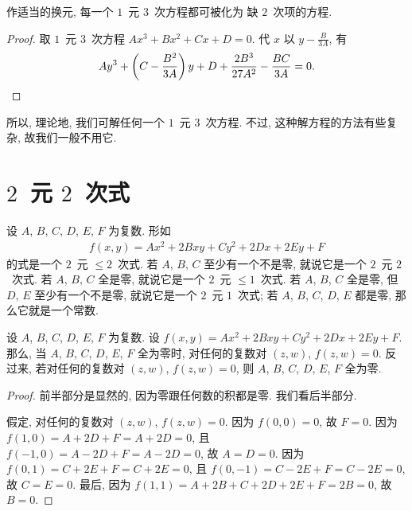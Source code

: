 \begin{theorem}
    作适当的换元,
    每一个 \(1\)~元 \(3\)~次方程都可被化为%
    缺 \(2\)~次项的方程.
\end{theorem}

\begin{proof}
    取 \(1\)~元 \(3\)~次方程 \(Ax^3 + Bx^2 + Cx + D = 0\).
    代 \(x\) 以 \(y - \frac{B}{3A}\), 有
    \begin{equation*}
        Ay^3 + \left(C - \frac{B^2}{3A} \right)y
        + D + \frac{2B^3}{27A^2} - \frac{BC}{3A} = 0.
        \qedhere
    \end{equation*}
\end{proof}

所以, 理论地, 我们可解任何一个 \(1\)~元 \(3\)~次方程.
不过, 这种解方程的方法有些复杂,
故我们一般不用它.

\section{\texorpdfstring{\(2\)~元 \(2\)~次式}{2 元 2 次式}}

设 \(A\), \(B\), \(C\), \(D\), \(E\), \(F\) 为复数.
形如
\begin{align*}
    f(x, y) = Ax^2 + 2Bxy + Cy^2 + 2Dx + 2Ey + F
\end{align*}
的式是一个 \(2\)~元 \({\leq} 2\)~次式.
若 \(A\), \(B\), \(C\) 至少有一个不是零,
就说它是一个 \(2\)~元 \(2\)~次式.
若 \(A\), \(B\), \(C\) 全是零,
就说它是一个 \(2\)~元 \({\leq} 1\)~次式.
若 \(A\), \(B\), \(C\) 全是零,
但 \(D\), \(E\) 至少有一个不是零,
就说它是一个 \(2\)~元 \(1\)~次式;
若 \(A\), \(B\), \(C\), \(D\), \(E\) 都是零,
那么它就是一个常数.

\begin{theorem}
    设 \(A\), \(B\), \(C\), \(D\), \(E\), \(F\) 为复数.
    设 \(f(x, y) = Ax^2 + 2Bxy + Cy^2 + 2Dx + 2Ey + F\).
    那么, 当 \(A\), \(B\), \(C\), \(D\), \(E\), \(F\)
    全为零时,
    对任何的复数对 \((z, w)\),
    \(f(z, w) = 0\).
    反过来, 若对任何的复数对 \((z, w)\),
    \(f(z, w) = 0\),
    则 \(A\), \(B\), \(C\), \(D\), \(E\), \(F\)
    全为零.
\end{theorem}

\begin{proof}
    前半部分是显然的, 因为零跟任何数的积都是零.
    我们看后半部分.

    假定, 对任何的复数对 \((z, w)\), \(f(z, w) = 0\).
    因为 \(f(0, 0) = 0\), 故 \(F = 0\).
    因为 \(f(1, 0) = A + 2D + F = A + 2D = 0\),
    且 \(f(-1, 0) = A - 2D + F = A - 2D = 0\),
    故 \(A = D = 0\).
    因为 \(f(0, 1) = C + 2E + F = C + 2E = 0\),
    且 \(f(0, -1) = C - 2E + F = C - 2E = 0\),
    故 \(C = E = 0\).
    最后, 因为
    \(f(1, 1) = A + 2B + C + 2D + 2E + F = 2B = 0\),
    故 \(B = 0\).
\end{proof}

